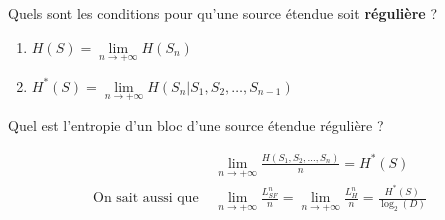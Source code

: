 \documentclass[12pt]{article}
\newcommand*{\xfield}[1]{\begin{mdframed}\centering #1\end{mdframed}\bigskip}
\newenvironment{note}{}{}
\begin{document}
\begin{note}
	\xfield{Quels sont les conditions pour qu'une source étendue soit \textbf{régulière} ?}
	\xfield{\begin{enumerate}
	\item $H(S) = \lim\limits_{n \to +\infty} H(S_n)$
	\item $H^*(S) = \lim\limits_{n \to +\infty} H(S_n|S_1,S_2,\hdots,S_{n-1})$
	\end{enumerate}}
\end{note}

\begin{note}
	\xfield{Quel est l'entropie d'un bloc d'une source étendue régulière ?}
	\xfield{\begin{align*}
	&\lim\limits_{n \to +\infty} \frac{H(S_1,S_2,\hdots,S_n)}{n} = H^*(S)\\
	\text{On sait aussi que } &\lim\limits_{n \to +\infty} \frac{L^n_{SF}}{n}=\lim\limits_{n \to +\infty}\frac{L^n_H}{n}=\frac{H^*(S)}{\log_2(D)}
	\end{align*}}
\end{note}
\end{document}
